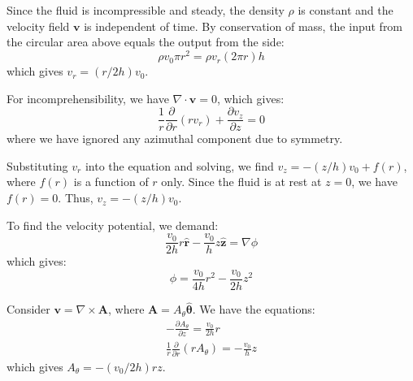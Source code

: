 \documentclass[12pt]{article}
\begin{document}



\pagebreak
\section*{}



Since the fluid is incompressible and steady, the density $\rho$ is constant and the velocity field $\mathbf{v}$ is independent of time. By conservation of mass, the input from the circular area above equals the output from the side:
\begin{equation}
    \rho v_{0} \pi r^{2} = \rho v_{r} (2\pi r) h
\end{equation}
which gives $v_{r} = (r/2h) v_{0}$.

For incomprehensibility, we have $\nabla \cdot \mathbf{v} = 0$, which gives:
\begin{equation}
    \frac{1}{r} \frac{\partial}{\partial r} (r v_{r}) + \frac{\partial v_{z}}{\partial z} = 0
\end{equation}
where we have ignored any azimuthal component due to symmetry.

Substituting $v_{r}$ into the equation and solving, we find $v_{z} = -(z/h) v_{0} + f(r)$, where $f(r)$ is a function of $r$ only. Since the fluid is at rest at $z = 0$, we have $f(r) = 0$. Thus, $v_{z} = -(z/h) v_{0}$.

To find the velocity potential, we demand:
\begin{equation}
    \frac{v_{0}}{2h} r \hat{\mathbf{r}} - \frac{v_{0}}{h} z \hat{\mathbf{z}} = \nabla \phi
\end{equation}
which gives:
\begin{equation}
    \phi = \frac{v_{0}}{4h} r^{2} - \frac{v_{0}}{2h} z^{2}
\end{equation}

Consider $\mathbf{v} = \nabla \times \mathbf{A}$, where $\mathbf{A} = A_{\theta} \hat{\mathbf{\theta}}$. We have the equations:
\begin{equation}
    \begin{split}
        -\frac{\partial A_{\theta}}{\partial z} = \frac{v_{0}}{2h} r \\
        \frac{1}{r} \frac{\partial}{\partial r} (r A_{\theta}) = -\frac{v_{0}}{h} z
    \end{split}
\end{equation}
which gives $A_{\theta} = -(v_{0}/2h) r z$.
\end{document}

